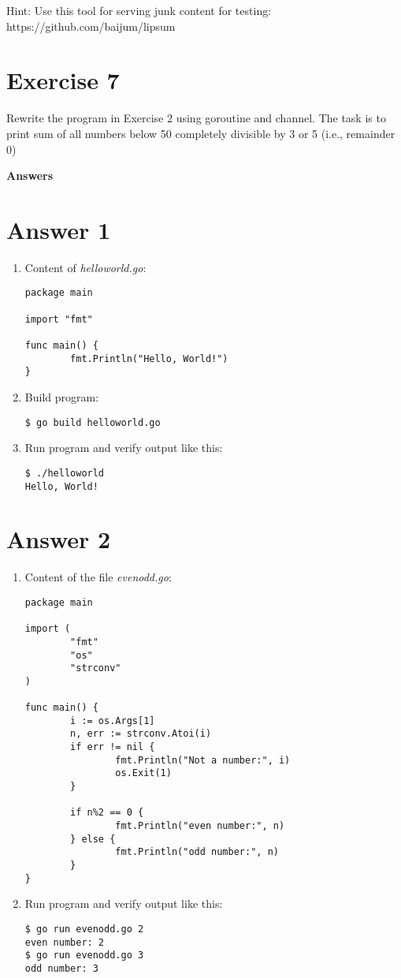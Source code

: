 \documentclass[11pt,a4paper]{article}
\begin{document}
\noindent
Hint: Use this tool for serving junk content for testing:
https://github.com/baijum/lipsum

\section*{Exercise 7}

Rewrite the program in Exercise 2 using goroutine and channel.  The
task is to print sum of all numbers below 50 completely divisible by 3
or 5 (i.e., remainder 0)

\newpage

\centerline{\LARGE\bf Answers}
\section*{Answer 1}

\begin{enumerate}
\item Content of {\it helloworld.go}:
\begin{verbatim}
package main

import "fmt"

func main() {
        fmt.Println("Hello, World!")
}
\end{verbatim}

\item Build program:
\begin{verbatim}
$ go build helloworld.go
\end{verbatim}

\item Run program and verify output like this:
\begin{verbatim}
$ ./helloworld
Hello, World!
\end{verbatim}
\end{enumerate}

\section*{Answer 2}
\begin{enumerate}
\item Content of the file {\it evenodd.go}:
\begin{verbatim}
package main

import (
        "fmt"
        "os"
        "strconv"
)

func main() {
        i := os.Args[1]
        n, err := strconv.Atoi(i)
        if err != nil {
                fmt.Println("Not a number:", i)
                os.Exit(1)
        }

        if n%2 == 0 {
                fmt.Println("even number:", n)
        } else {
                fmt.Println("odd number:", n)
        }
}
\end{verbatim}

\item Run program and verify output like this:
\begin{verbatim}
$ go run evenodd.go 2
even number: 2
$ go run evenodd.go 3
odd number: 3
\end{verbatim}

\end{enumerate}
\end{document}
